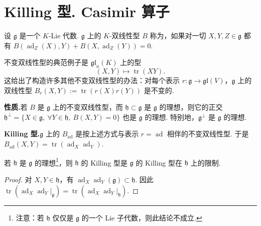 \section{Killing 型. Casimir 算子}\label{sec:ssl-2-3}
\begin{definition}\label{def:ssl-2-3-1}
设 $\mathfrak g$ 是一个 $K$-Lie 代数. $\mathfrak g$ 上的 $K$-双线性型 $B$ 称为，如果对一切 $X, Y, Z \in \mathfrak g$ 都有 $B(\operatorname{ad}_{Z}(X), Y) + B(X, \operatorname{ad}_{Z}(Y)) = 0$.
\end{definition}
\begin{example*}
不变双线性型的典范例子是 $\mathfrak{gl}_{n}(K)$ 上的型
\[(X, Y) \longmapsto \operatorname{tr}(XY).\]
这给出了构造许多其他不变双线性型的办法：对每个表示 $r : \mathfrak g \longrightarrow \mathfrak{gl}(V)$，$\mathfrak g$ 上的双线性型 $B_{r}(X, Y) := \operatorname{tr}(r(X)r(Y))$ 是不变的.
\end{example*}
\textbf{性质.}\quad 若 $B$ 是 $\mathfrak g$ 上的不变双线性型，而 $\mathfrak h \subset \mathfrak g$ 是 $\mathfrak g$ 的理想，则它的正交 $\mathfrak h^{\perp} = \{X \in \mathfrak g,\ \forall Y \in \mathfrak h,\ B(X, Y) = 0\}$ 也是 $\mathfrak g$ 的理想. 特别地，$\mathfrak g^{\perp}$ 是 $\mathfrak g$ 的理想.

\textbf{Killing 型.}\quad $\mathfrak g$ 上的 $B_{\operatorname{ad}}$ 是按上述方式与表示 $r = \operatorname{ad}$ 相伴的不变双线性型. 于是 $B_{\operatorname{ad}}(X, Y) = \operatorname{tr}(\operatorname{ad}_{X}\operatorname{ad}_{Y})$.

\begin{lemma}\label{lemma:ssl-2-3-2}
若 $\mathfrak h$ 是 $\mathfrak g$ 的理想\footnote{注意：若 $\mathfrak h$ 仅仅是 $\mathfrak g$ 的一个 Lie 子代数，则此结论不成立.}，则 $\mathfrak h$ 的 Killing 型是 $\mathfrak g$ 的 Killing 型在 $\mathfrak h$ 上的限制.
\end{lemma}
\begin{proof}
对 $X, Y \in \mathfrak h$，有 $\operatorname{ad}_{X}\operatorname{ad}_{Y}(\mathfrak g) \subset \mathfrak h$. 因此 $\operatorname{tr}(\operatorname{ad}_{X}\operatorname{ad}_{Y}|_{\mathfrak g}) = \operatorname{tr}(\operatorname{ad}_{X}\operatorname{ad}_{Y}|_{\mathfrak h})$.
\end{proof}

